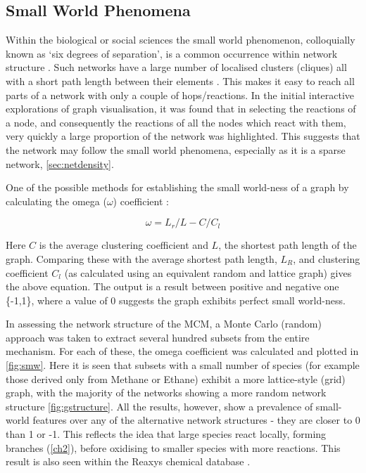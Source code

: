 \subsection{Small World Phenomena}
Within the biological or social sciences the small world phenomenon, colloquially known as `six degrees of separation', is a common occurrence within network structure \citep{smallworld}. Such networks have a large number of localised clusters (cliques) all with a short path length between their elements \citep{sm2}. This makes it easy to reach all parts of a network with only a couple of hops/reactions. In the initial interactive explorations of graph visualisation, it was found that in selecting the reactions of a node, and consequently the reactions of all the nodes which react with them, very quickly a large proportion of the network was highlighted. This suggests that the network may follow the small world phenomena, especially as it is a sparse network, \autoref{sec:netdensity}.

One of the possible methods for establishing the small world-ness of a graph by calculating the omega ($\omega$) coefficient \citep{networkx}:

\begin{equation}
\omega = L_r/L - C/C_l
\end{equation}

Here $C$ is the average clustering coefficient and $L$, the shortest path length of the graph. Comparing these with the average shortest path length, $L_R$, and clustering coefficient $C_l$ (as calculated using an equivalent random and lattice graph) gives the above equation. The output is a result between positive and negative one \{-1,1\}, where a value of 0 suggests the graph exhibits perfect small world-ness.

In assessing the network structure of the MCM, a Monte Carlo (random) approach was taken to extract several hundred subsets from the entire mechanism. For each of these, the omega coefficient was calculated and plotted in \autoref{fig:smw}. Here it is seen that subsets with a small number of species (for example those derived only from Methane or Ethane) exhibit a more lattice-style (grid) graph, with the majority of the networks showing a more random network structure \autoref{fig:gstructure}. All the results, however, show a prevalence of small-world features over any of the alternative network structures - they are closer to 0 than 1 or -1. This reflects the idea that large species react locally, forming branches (\autoref{ch2}), before oxidising to smaller species with more reactions. This result is also seen within the Reaxys chemical database \citep{rscgraph}.



